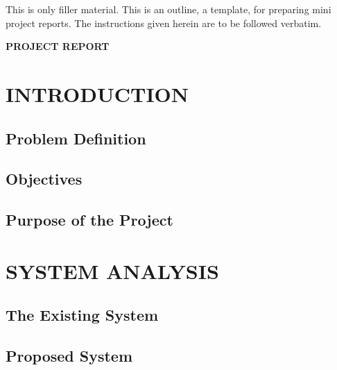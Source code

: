 This is only filler material. This is an outline, a template, 
for preparing mini project reports. The instructions given 
herein are to be followed verbatim.
%
%
%
\clearpage
{}
\tableofcontents
%
%
\clearpage
{}
\listoftables
%
%
\clearpage
{}
\listoffigures
%
%
\mainmatter
%
\clearpage
\quad\vfill
\begin{center}
{\Huge \bf PROJECT REPORT}
\end{center}
\vfill
\clearpage
%
%
% 
%
%
%  
\chapter{INTRODUCTION}

%
\section{Problem Definition}
%
\section{Objectives}
%
\section{Purpose of the Project}

%
%
%
\chapter{SYSTEM ANALYSIS}
%
\section{The Existing System}	

\section{Proposed System}
%
%
%
%
